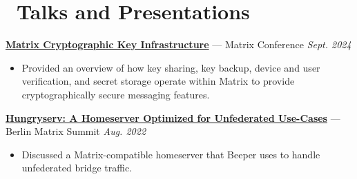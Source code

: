 \documentclass[10pt,letterpaper]{article}
\begin{document}
\section*{\faUsers\ Talks and Presentations}

{\fontsize{11}{0}\href{https://sumnerevans.com/posts/matrix/cryptographic-key-infrastructure}{%
\textbf{Matrix Cryptographic Key Infrastructure}}
--- Matrix Conference}
\hfill \textit{Sept. 2024}
\begin{itemize}
    \item Provided an overview of how key sharing, key backup, device and user
        verification, and secret storage operate within Matrix to provide
        cryptographically secure messaging features.
\end{itemize}

{\fontsize{11}{0}\href{https://github.com/sumnerevans/hungryserv-presentation}{%
\textbf{Hungryserv: A Homeserver Optimized for Unfederated Use-Cases}}
--- Berlin Matrix Summit}
\hfill \textit{Aug. 2022}
\begin{itemize}
    \item Discussed a Matrix-compatible homeserver that Beeper uses to handle
        unfederated bridge traffic.
\end{itemize}


\end{document}

